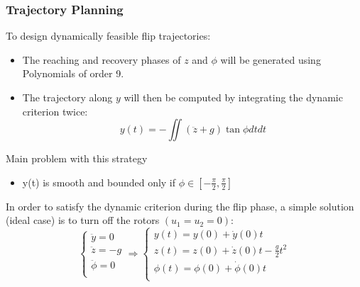 \documentclass{thesisbeamer}
\newcommand\Fontvi{\fontsize{9}{10}\selectfont}
\begin{document}
\begin{frame}
	\frametitle{Trajectory Planning}
	\Fontvi
	
	To design dynamically feasible flip trajectories:
	
	\begin{itemize}
		\item The reaching and recovery phases of $z$ and $\phi$ will be generated using Polynomials of order 9.
		\item The trajectory along $y$ will then be computed by integrating the dynamic criterion twice: 
		\begin{equation}
			y(t) = - \iint (\ddot{z} + g) \tan \phi dt dt
		\end{equation}
	\end{itemize}	
	
	\begingroup
    \fontsize{9pt}{10pt}\selectfont
    \begin{alertblock}{Main problem with this strategy}
		\begin{itemize}
			\item y(t) is smooth and bounded only if $\phi \in [-\frac{\pi}{2},\frac{\pi}{2}]$
		\end{itemize}
		\end{alertblock}
	\endgroup	
	
	In order to satisfy the dynamic criterion during the flip phase, a simple solution (ideal case) is to turn off the rotors $(u_1=u_2=0)$:
	\begin{equation}
 		\begin{cases} 
			\ddot{y} = 0 \\
       		\ddot{z} = - g  \\
       		\ddot{\phi} = 0 \\
   		\end{cases} 
   		\Rightarrow
 		\begin{cases} 
       		y(t) = y(0) + \dot{y}(0)t \\
       		z(t) = z(0) +\dot{z}(0)t - \frac{g}{2}t^2  \\
       		\phi(t) = \phi(0) + \dot{\phi}(0)t \\
   		\end{cases}
	\end{equation}

\end{frame}
\end{document}

